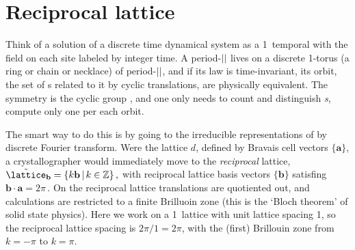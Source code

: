 

\section{Reciprocal lattice}
\label{sect:LC21recip1d} %

Think of a solution of a discrete time dynamical system as a 1\dmn\
temporal {\lattstate} with the field on each site labeled by integer
time.
A period-${||}$ {\lattstate} lives on a discrete 1-torus (a ring or chain or
necklace) of period-${||}$, and if its law is time-invariant, its orbit, the set of
{\lattstate}s related to it by cyclic translations, are
physically equivalent. The symmetry is the cyclic group
, and one only needs to count and distinguish  \emph{{\orbit}s},
compute only one {\lattstate} per each orbit.

The smart way to do this is by going to the irreducible representations
of \Cn{n} by discrete Fourier transform.
Were the lattice $d$\dmn, defined by Bravais cell vectors $\{\mathbf{a}\}$, a
crystallographer would immediately move to the \emph{reciprocal}
lattice,
\( %
\tilde{\lattice}_{\mathbf{b}} = \{k \mathbf{b}\,|\, k \in \mathbb{Z}\}
\,,
\) %
with {reciprocal}
lattice basis vectors $\{\mathbf{b}\}$ satisfing
\( %
\mathbf{b} \cdot \mathbf{a} = 2 \pi
\,.
\) %
On the {reciprocal} lattice translations are
quotiented out, and calculations are restricted to a finite
{Brilluoin zone} (this is the {`Bloch theorem'} of
solid state physics). Here we work on a 1\dmn\ lattice with unit
lattice spacing 1, so the reciprocal lattice spacing is $2\pi/1=2\pi$, with
the (first) Brillouin zone from $k=-\pi$ to $k=\pi$.


